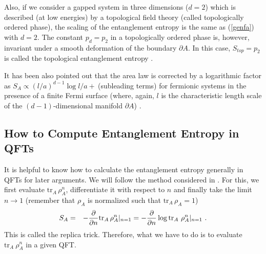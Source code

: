 \documentclass[12pt]{article}
\def\frac#1#2{{#1\over #2}}
\def\de{\partial}
\def\f {\frac}
\def\frac#1#2{{#1\over #2}}
\begin{document}
Also, if we consider a gapped system in three dimensions ($d=2$)
which is described (at low energies) by a topological field theory
(called topologically ordered phase), the scaling of the entanglement entropy
is the same as (\ref{genfa}) with $d=2$.
The constant $p_d=p_2$
in a topologically ordered phase is, however,
invariant under a smooth deformation of the boundary $\de A$. In this
case, $S_{top}=p_2$ is called the topological entanglement entropy \cite{Levin05,Kitaev05}.



It has been also pointed
out that the area law is corrected by a logarithmic factor as $S_A
\propto  (l/a)^{d-1}\log l/a+\ $(subleading terms) for fermionic
systems in the presence of a finite Fermi surface
(where, again, $l$ is the
characteristic length scale of the $(d-1)$-dimensional manifold
$\de A$) \cite{Wolf05, Gioev05, Barthel06, Li06, FaZi}.





\subsection{How to Compute Entanglement Entropy in QFTs}
\label{how to EE}
\hspace{5mm}
It is helpful to know how to calculate the entanglement entropy generally
in QFTs for later arguments. We will follow the method considered in \cite{Cardy}.
For this, we first
evaluate $\mathrm{tr}_A\,\rho_A^n$, differentiate it with
respect to $n$ and finally take the limit $n\to 1$ (remember that
$\rho_A$ is normalized such that $\mathrm{tr}_A\,\rho_A=1$)
\begin{eqnarray}
S_{A}
&=&
-\frac{\partial}{\partial n}
\mathrm{tr}_A\,\rho_A^n|_{n=1}
=
-\f{\de}{\de n}\log \mathrm{tr}_A~\rho_A^n|_{n=1} \ .
\label{deri}
\end{eqnarray}
This is called the replica trick. Therefore, what we have to do is
to evaluate $\mathrm{tr}_A~\rho_A^n$ in a given QFT.
\end{document}
